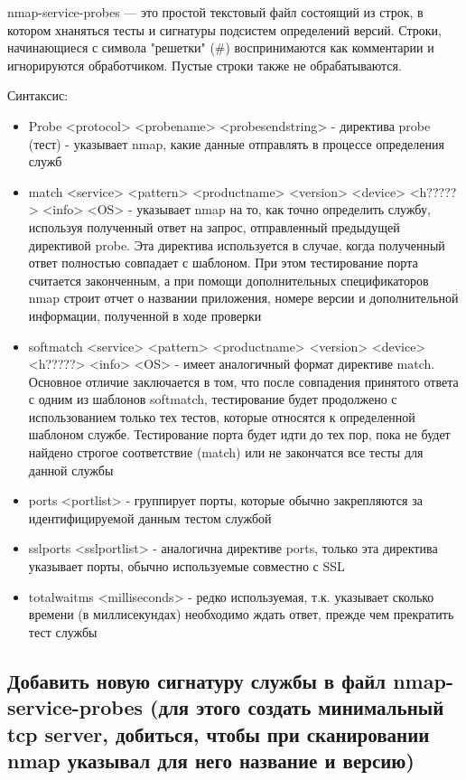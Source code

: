 \documentclass[11pt, a4paper]{article}		%
\begin{document}
nmap-service-probes — это простой текстовый файл состоящий из строк, в котором хнаняться тесты и сигнатуры подсистем определений версий. Строки, начинающиеся с символа "решетки" (\#) воспринимаются как комментарии и игнорируются обработчиком. Пустые строки также не обрабатываются. 


Синтаксис: 
\begin{itemize}
\item Probe <protocol> <probename> <probesendstring> - директива probe (тест) - указывает nmap, какие данные отправлять в процессе определения служб
\item match <service> <pattern> <productname> <version> <device> <h?????> <info> <OS> - указывает nmap на то, как точно определить службу, используя полученный ответ на запрос, отправленный предыдущей директивой probe. Эта директива используется в случае, когда полученный ответ полностью совпадает с шаблоном. При этом тестирование порта считается законченным, а при помощи дополнительных спецификаторов nmap строит отчет о названии приложения, номере версии и дополнительной информации, полученной в ходе проверки
\item softmatch <service> <pattern> <productname> <version> <device> <h?????> <info> <OS> - имеет аналогичный формат директиве match. Основное отличие заключается в том, что после совпадения принятого ответа с одним из шаблонов softmatch, тестирование будет продолжено с использованием только тех тестов, которые относятся к определенной шаблоном службе. Тестирование порта будет идти до тех пор, пока не будет найдено строгое соответствие (match) или не закончатся все тесты для данной службы
\item ports <portlist> - группирует порты, которые обычно закрепляются за идентифицируемой данным тестом службой
\item sslports <sslportlist> - аналогична директиве ports, только эта директива указывает порты, обычно используемые совместно с SSL
\item totalwaitms <milliseconds> - редко используемая, т.к. указывает сколько времени (в миллисекундах) необходимо ждать ответ, прежде чем прекратить тест службы
\end{itemize}


\subsection{Добавить новую сигнатуру службы в файл nmap-service-probes (для этого создать минимальный tcp server, добиться, чтобы при сканировании nmap указывал для него название и версию)}
\end{document}
